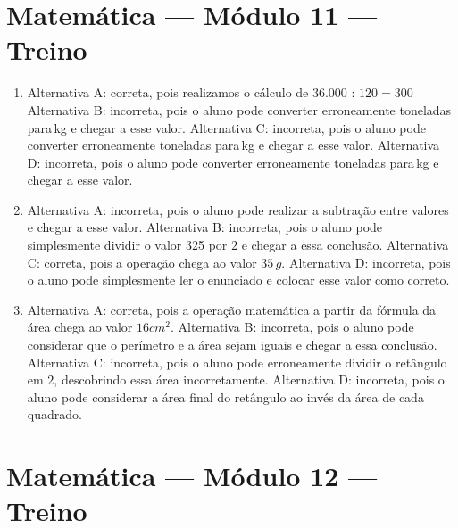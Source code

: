 \section*{Matemática — Módulo 11 — Treino}

\begin{enumerate}

\item Alternativa A: correta, pois realizamos o cálculo de $36.000$ : $120 = 300$
Alternativa B: incorreta, pois o aluno pode converter erroneamente
toneladas para\,kg e chegar a esse valor.
Alternativa C: incorreta, pois o aluno pode converter erroneamente
toneladas para\,kg e chegar a esse valor.
Alternativa D: incorreta, pois o aluno pode converter erroneamente
toneladas para\,kg e chegar a esse valor.
\item Alternativa A: incorreta, pois o aluno pode realizar a subtração entre
valores e chegar a esse valor.
Alternativa B: incorreta, pois o aluno pode simplesmente dividir o valor
325 por $2$ e chegar a essa conclusão.
Alternativa C: correta, pois a operação chega ao valor $35\,g$.
Alternativa D: incorreta, pois o aluno pode simplesmente ler o enunciado
e colocar esse valor como correto.
\item Alternativa A: correta, pois a operação matemática a partir da fórmula
da área chega ao valor $16cm^2$.
Alternativa B: incorreta, pois o aluno pode considerar que o perímetro e
a área sejam iguais e chegar a essa conclusão.
Alternativa C: incorreta, pois o aluno pode erroneamente dividir o
retângulo em $2$, descobrindo essa área incorretamente.
Alternativa D: incorreta, pois o aluno pode considerar a área final do
retângulo ao invés da área de cada quadrado.
\end{enumerate}

\section*{Matemática — Módulo 12 — Treino}

